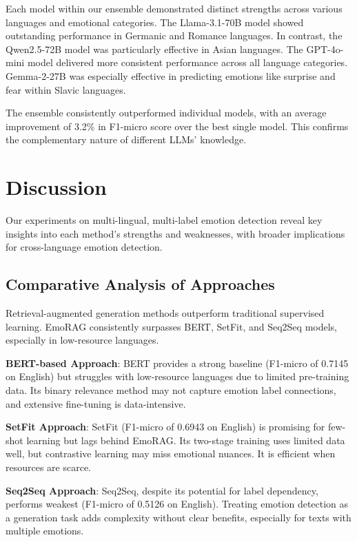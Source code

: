 \documentclass[a4paper,12pt]{extarticle}
\begin{document}
Each model within our ensemble demonstrated distinct strengths across various languages and emotional categories. 
The Llama-3.1-70B model showed outstanding performance in Germanic and Romance languages. 
In contrast, the Qwen2.5-72B model was particularly effective in Asian languages. 
The GPT-4o-mini model delivered more consistent performance across all language categories. 
Gemma-2-27B was especially effective in predicting emotions like surprise and fear within Slavic languages.

The ensemble consistently outperformed individual models, with an average improvement of 3.2\% in F1-micro score over the best single model. 
This confirms the complementary nature of different LLMs' knowledge.

\section{Discussion}

Our experiments on multi-lingual, multi-label emotion detection reveal key insights into each method's strengths and weaknesses, with broader implications for cross-language emotion detection.

\subsection{Comparative Analysis of Approaches}

Retrieval-augmented generation methods outperform traditional supervised learning. EmoRAG consistently surpasses BERT, SetFit, and Seq2Seq models, especially in low-resource languages.

\textbf{BERT-based Approach}: BERT provides a strong baseline (F1-micro of 0.7145 on English) but struggles with low-resource languages due to limited pre-training data. Its binary relevance method may not capture emotion label connections, and extensive fine-tuning is data-intensive.

\textbf{SetFit Approach}: SetFit (F1-micro of 0.6943 on English) is promising for few-shot learning but lags behind EmoRAG. Its two-stage training uses limited data well, but contrastive learning may miss emotional nuances. It is efficient when resources are scarce.

\textbf{Seq2Seq Approach}: Seq2Seq, despite its potential for label dependency, performs weakest (F1-micro of 0.5126 on English). Treating emotion detection as a generation task adds complexity without clear benefits, especially for texts with multiple emotions.
\end{document}
